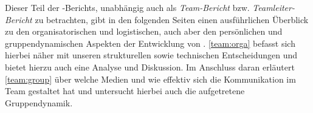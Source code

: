 
Dieser Teil der \erasim{}-Berichts, unabhängig auch als \emph{Team-Bericht} bzw.
\emph{Teamleiter-Bericht} zu betrachten, gibt in den folgenden Seiten einen
ausführlichen Überblick zu den organisatorischen und logistischen, auch aber den
persönlichen und gruppendynamischen Aspekten der Entwicklung von \erasim{}.
\autoref{team:orga} befasst sich hierbei näher mit unseren strukturellen sowie
technischen Entscheidungen und bietet hierzu auch eine Analyse und Diskussion.
Im Anschluss daran erläutert \autoref{team:group} über welche Medien und wie
effektiv sich die Kommunikation im Team gestaltet hat und untersucht hierbei
auch die aufgetretene Gruppendynamik.
